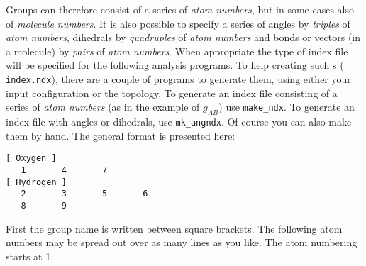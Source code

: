 Groups can therefore consist of a series of {\em atom numbers}, but in
some cases also of {\em molecule numbers}.  It is also possible to
specify a series of angles by {\em triples} of {\em atom numbers},
dihedrals by {\em quadruples} of {\em atom numbers} and bonds or
vectors (in a molecule) by {\em pairs} of {\em atom numbers}. When
appropriate the type of index file will be specified for the following
analysis programs.  To help creating such s ({\tt
index.ndx}), there are a couple of programs to generate them, using
either your input configuration or the topology.  To generate an
index file consisting of a series of {\em atom numbers} (as in the
example of $g_{AB}$) use {\tt make\_ndx}. To generate an index file
with angles or dihedrals, use {\tt mk\_angndx}. Of course you can also
make them by hand. The general format is presented here:
{\samepage
\begin{verbatim}
[ Oxygen ]
   1       4       7 
[ Hydrogen ]
   2       3       5       6
   8       9
\end{verbatim}}

First the group name is written between square brackets. The following
atom numbers may be spread out over as many lines as you like. The
atom numbering starts at 1.

